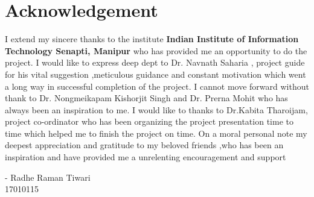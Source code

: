 \chapter*{Acknowledgement}

\thispagestyle{empty}


{\en


I extend my sincere thanks to the institute \textbf{Indian Institute of Information Technology Senapti, Manipur} who has provided me an opportunity to do the project. I would like to express deep dept to Dr. Navnath Saharia , project guide for his vital suggestion ,meticulous guidance and constant motivation which went a long way in successful completion of the project. I cannot move forward without thank to  Dr. Nongmeikapam Kishorjit Singh and Dr. Prerna Mohit who has always been an inspiration to me. I would
like to thanks to Dr.Kabita Tharoijam, project co-ordinator who has been organizing the
project presentation time to time which helped me to finish the project on time. On a moral personal note my deepest appreciation and gratitude to my beloved friends ,who has been an inspiration and have provided me a unrelenting encouragement and support

}
\begin{flushright}

{\en - Radhe Raman Tiwari\\ 17010115}
\end{flushright}

